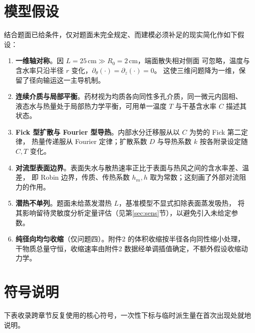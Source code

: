\section{模型假设}

结合题面已给条件，仅对题面未完全规定、而建模必须补足的现实简化作如下假设：

\begin{enumerate}
\item[(1)] \textbf{一维轴对称}。因 $L=25\,\mathrm{cm}\gg R_0=2\,\mathrm{cm}$，端面散失相对侧面
      可忽略，温度与含水率只沿半径 $r$ 变化，$\partial_\theta(\cdot)=\partial_z(\cdot)=0$。
      这使三维问题降为一维，保留了径向输运这一主导机制。
\item[(2)] \textbf{连续介质与局部平衡}。药材视为均质各向同性多孔介质，同一微元内固相、
      液态水与热量处于局部热力学平衡，可用单一温度 $T$ 与干基含水率 $C$ 描述其状态。
\item[(3)] \textbf{Fick 型扩散与 Fourier 型导热}。内部水分迁移服从以 $C$ 为势的 Fick 第二定律，
      热量传递服从 Fourier 定律；扩散系数 $D$ 与导热系数 $k$ 按各附录设定随 $C,T$ 变化。
\item[(4)] \textbf{对流型表面边界}。表面失水与散热速率正比于表面与热风之间的含水率差、温差，
      即 Robin 边界，传质、传热系数 $h_m,h$ 取为常数；这刻画了外部对流阻力的作用。
\item[(5)] \textbf{潜热不单列}。题面未给蒸发潜热 $L$，基准模型不显式扣除表面蒸发吸热，
      将其影响留待灵敏度分析定量评估（见第\ref{sec:sens}节），以避免引入未给定参数。
\item[(6)] \textbf{纯径向均匀收缩}（仅问题四）。附件2 的体积收缩按半径各向同性缩小处理，
      干物质总量守恒，收缩速率由附件2 数据经单调插值确定，不额外假设收缩动力学。
\end{enumerate}

\section{符号说明}

下表收录跨章节反复使用的核心符号，一次性下标与临时派生量在首次出现处就地说明。

